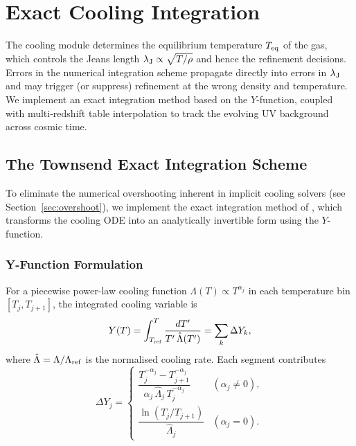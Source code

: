 \documentclass[fleqn,usenatbib]{mnras}
\newcommand{\lJ}{\lambda_{\rm J}}
\begin{document}
\section{Exact Cooling Integration}
\label{sec:exact_cooling}

The cooling module determines the equilibrium temperature $T_{\rm eq}$
of the gas, which controls the Jeans length
$\lJ \propto \sqrt{T/\rho}$ and hence the refinement decisions.
Errors in the numerical integration scheme propagate directly into
errors in $\lJ$ and may trigger (or suppress) refinement at the wrong
density and temperature.  We implement an exact integration method
based on the \citet{Townsend2009} $Y$-function, coupled with
multi-redshift table interpolation to track the evolving UV background
across cosmic time.


\subsection{The Townsend Exact Integration Scheme}
\label{sec:townsend}

To eliminate the numerical overshooting inherent in implicit
cooling solvers (see Section~\ref{sec:overshoot}), we implement the exact integration
method of \citet{Townsend2009}, which transforms the cooling ODE into
an analytically invertible form using the $Y$-function.

\subsubsection{Y-Function Formulation}

For a piecewise power-law cooling function
$\Lambda(T) \propto T^{\alpha_j}$ in each temperature bin
$[T_j, T_{j+1}]$, the integrated cooling variable is
\begin{equation}
  Y(T) = \int_{T_{\rm ref}}^{T} \frac{dT'}{T'\,\hat{\Lambda}(T')}
  = \sum_{k} \Delta Y_k,
  \label{eq:Y_func}
\end{equation}
where $\hat{\Lambda} = \Lambda/\Lambda_{\rm ref}$ is the normalised
cooling rate.  Each segment contributes
\begin{equation}
  \Delta Y_j = \begin{cases}
    \dfrac{T_j^{-\alpha_j} - T_{j+1}^{-\alpha_j}}
          {\alpha_j\,\hat{\Lambda}_j\,T_j^{-\alpha_j}}
    & (\alpha_j \ne 0), \\[6pt]
    \dfrac{\ln(T_j/T_{j+1})}{\hat{\Lambda}_j}
    & (\alpha_j = 0).
  \end{cases}
  \label{eq:deltaY}
\end{equation}
\end{document}
